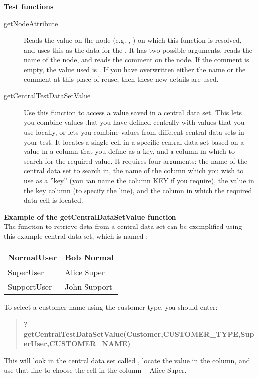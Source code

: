 \textbf{Test functions}\\
\begin{description}
\item [getNodeAttribute]{Reads the value on the node (e.g. \gdcase{}, \gdstep{}) on which this function is resolved, and uses this as the data for the \gdstep{}. It has two possible arguments,  reads the name of the node, and  reads the comment on the node. If the comment is empty, the value used is . If you have overwritten either the name or the comment at this place of reuse, then these new details are used.} 
\item [getCentralTestDataSetValue]{Use this function to access a value saved in a central data set. This lets you combine values that you have defined centrally with values that you use locally, or lets you combine values from different central data sets in your test. It locates a single cell in a specific central data set based on a value in a column that you define as a key, and a column in which to search for the required value. It requires four arguments: the name of the central data set to search in, the name of the column which you wish to use as a ''key'' (you can name the column KEY if you require), the value in the key column (to specify the line), and the column in which the required data cell is located.}
\end{description}

\textbf{Example of the getCentralDataSetValue function}\\
The function to retrieve data from a central data set can be exemplified using this example central data set, which is named :

\begin{supertabular}{|p{6.0cm}p{6.0cm}|}
\hline
NormalUser & Bob Normal\\
\hline
SuperUser & Alice Super\\
\hline
SupportUser & John Support \\
\hline
\end{supertabular}

 To select a customer name using the customer type, you should enter:
\begin{quote}
\textbf{?getCentralTestDataSetValue(Customer,CUSTOMER\_TYPE,SuperUser,CUSTOMER\_NAME)}
\end{quote}
This will look in the central data set called , locate the value  in the  column, and use that line to choose the cell in the  column -- Alice Super. 


